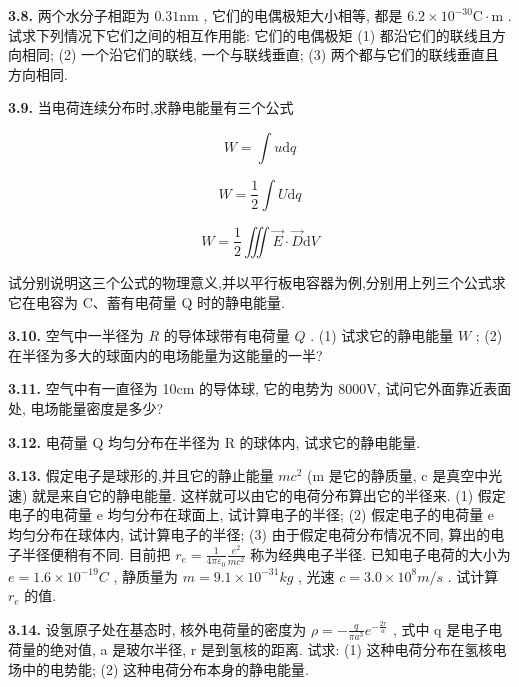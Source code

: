 \vfill
\newpage

\textbf{3.8.} 两个水分子相距为 $0.31\mathrm{nm}$ , 它们的电偶极矩大小相等, 都是 $6.2 \times 10^{-30}\mathrm{C} \cdot \mathrm{m}$ . 试求下列情况下它们之间的相互作用能: 它们的电偶极矩 (1) 都沿它们的联线且方向相同; (2) 一个沿它们的联线, 一个与联线垂直; (3) 两个都与它们的联线垂直且方向相同.

\vfill
\newpage

\textbf{3.9.} 当电荷连续分布时,求静电能量有三个公式

\[
W = \int u \mathrm{d} q
\]

\[
W = \frac {1}{2} \int U \mathrm{d} q
\]

\[
W = \frac {1}{2} \iiint \vec{E} \cdot \vec{D} \mathrm{d}V
\]

试分别说明这三个公式的物理意义,并以平行板电容器为例,分别用上列三个公式求它在电容为 C、蓄有电荷量 Q 时的静电能量.

\vfill
\newpage

\textbf{3.10.} 空气中一半径为 $R$ 的导体球带有电荷量 $Q$ . (1) 试求它的静电能量 $W$ ; (2) 在半径为多大的球面内的电场能量为这能量的一半?

\vfill
\newpage

\textbf{3.11.} 空气中有一直径为 10cm 的导体球, 它的电势为 8000V, 试问它外面靠近表面处, 电场能量密度是多少?

\vfill
\newpage

\textbf{3.12.} 电荷量 Q 均匀分布在半径为 R 的球体内, 试求它的静电能量.

\vfill
\newpage

\textbf{3.13.} 假定电子是球形的,并且它的静止能量 $mc^{2}$ (m 是它的静质量, c 是真空中光速) 就是来自它的静电能量. 这样就可以由它的电荷分布算出它的半径来. (1) 假定电子的电荷量 e 均匀分布在球面上, 试计算电子的半径; (2) 假定电子的电荷量 e 均匀分布在球体内, 试计算电子的半径; (3) 由于假定电荷分布情况不同, 算出的电子半径便稍有不同. 目前把 $\displaystyle r_{e} = \frac{1}{4\pi\varepsilon_{0}} \frac{e^{2}}{mc^{2}}$ 称为经典电子半径. 已知电子电荷的大小为 $e = 1.6 \times 10^{-19} C$ , 静质量为 $m = 9.1 \times 10^{-31} kg$ , 光速 $c = 3.0 \times 10^{8} m/s$ . 试计算 $r_{e}$ 的值.

\vfill
\newpage

\textbf{3.14.} 设氢原子处在基态时, 核外电荷量的密度为 $\displaystyle \rho = -\frac{q}{\pi a^{3}} e^{-\frac{2r}{a}}$ , 式中 q 是电子电荷量的绝对值, a 是玻尔半径, r 是到氢核的距离. 试求: (1) 这种电荷分布在氢核电场中的电势能; (2) 这种电荷分布本身的静电能量.

\vfill
\newpage

